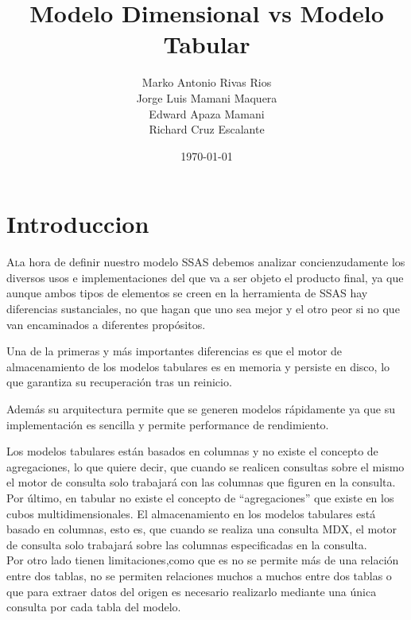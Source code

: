 \documentclass[twoside,twocolumn]{article}
\title{Modelo Dimensional vs Modelo Tabular}
\author{Marko Antonio Rivas Rios\\  Jorge Luis Mamani Maquera\\ Edward Apaza Mamani\\ Richard Cruz Escalante
}
\date{\today}
\begin{document}
\maketitle


\section{Introduccion}
\lettrine[nindent=0em,lines=3]{A} la hora de definir nuestro modelo SSAS debemos analizar concienzudamente los diversos usos e implementaciones del que va a ser objeto el producto final, ya que aunque ambos tipos de elementos se creen en la herramienta de SSAS hay diferencias sustanciales, no que hagan que uno sea mejor y el otro peor si no que van encaminados a diferentes propósitos.

Una de la primeras y más importantes diferencias es que el motor de almacenamiento de los modelos tabulares es en memoria y persiste en disco, lo que garantiza su recuperación tras un reinicio.

Además su arquitectura permite que se generen modelos rápidamente ya que su implementación es sencilla y permite performance de rendimiento.

Los modelos tabulares están basados en columnas y no existe el concepto de agregaciones, lo que quiere decir, que cuando se realicen consultas sobre el mismo el motor de consulta solo trabajará con las columnas que figuren en la consulta.\textbf{}\\
Por último, en tabular no existe el concepto de “agregaciones” que existe en los cubos multidimensionales. El almacenamiento en los modelos tabulares está basado en columnas, esto es, que cuando se realiza una consulta MDX, el motor de consulta solo trabajará sobre las columnas especificadas en la consulta.
\textbf{}\\
Por otro lado tienen limitaciones,como que es no se permite más de una relación entre dos tablas, no se permiten relaciones muchos a muchos entre dos tablas o que para extraer datos del origen es necesario realizarlo mediante una única consulta por cada tabla del modelo.




\end{document}
